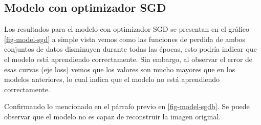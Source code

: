 \documentclass[aps,prl,reprint,groupedaddress]{revtex4-2}
\begin{document}
\subsection{Modelo con optimizador SGD}

Los resultados para el modelo con optimizador SGD se presentan en el gráfico 
\ref{fig-model-sgd} a simple vista vemos como las funciones de perdida de 
ambos conjuntos de datos disminuyen durante todas las épocas, esto podría
indicar que el modelo está aprendiendo correctamente. Sin embargo, al observar 
el error de esas curvas (eje loss) vemos que los valores son mucho mayores que
en los modelos anteriores, lo cual indica que el modelo no está aprendiendo
correctamente.

Confirmando lo mencionado en el párrafo previo en \ref{fig-model-sgdb}. Se puede 
observar que el modelo no es capaz de reconstruir la imagen original.
\end{document}
